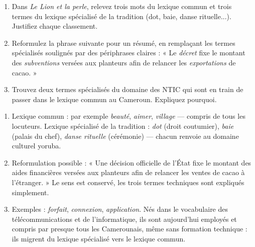 \documentclass[11pt]{article}
\begin{document}
\begin{exercice}
\begin{enumerate}
\item Dans \emph{Le Lion et la perle}, relevez trois mots du lexique commun et trois termes du lexique spécialisé de la tradition (dot, baie, danse rituelle...). Justifiez chaque classement.
\item Reformulez la phrase suivante pour un résumé, en remplaçant les termes spécialisés soulignés par des périphrases claires : « Le \emph{décret} fixe le montant des \emph{subventions} versées aux planteurs afin de relancer les \emph{exportations} de cacao. »
\item Trouvez deux termes spécialisés du domaine des NTIC qui sont en train de passer dans le lexique commun au Cameroun. Expliquez pourquoi.
\end{enumerate}
\end{exercice}

\begin{corrige}
\begin{enumerate}
\item Lexique commun : par exemple \emph{beauté}, \emph{aimer}, \emph{village} — compris de tous les locuteurs. Lexique spécialisé de la tradition : \emph{dot} (droit coutumier), \emph{baie} (palais du chef), \emph{danse rituelle} (cérémonie) — chacun renvoie au domaine culturel yoruba.
\item Reformulation possible : « Une décision officielle de l'État fixe le montant des aides financières versées aux planteurs afin de relancer les ventes de cacao à l'étranger. » Le sens est conservé, les trois termes techniques sont expliqués simplement.
\item Exemples : \emph{forfait}, \emph{connexion}, \emph{application}. Nés dans le vocabulaire des télécommunications et de l'informatique, ils sont aujourd'hui employés et compris par presque tous les Camerounais, même sans formation technique : ils migrent du lexique spécialisé vers le lexique commun.
\end{enumerate}
\end{corrige}
\end{document}
